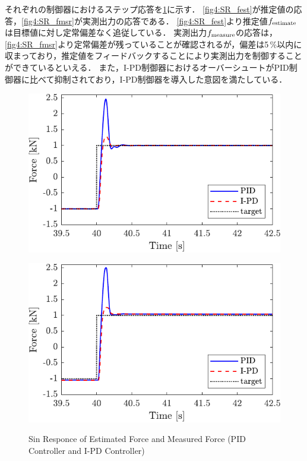 それぞれの制御器におけるステップ応答を\figname\ref{fig4:SRofPIDandIPD}に示す．
\figname\ref{fig4:SR_fest}が推定値の応答，\figname\ref{fig4:SR_fmsr}が実測出力の応答である．
\figname\ref{fig4:SR_fest}より推定値$f_\mathrm{estimate}$は目標値に対し定常偏差なく追従している．
実測出力$f_\mathrm{measure}$の応答は，\figname\ref{fig4:SR_fmsr}より定常偏差が残っていることが確認されるが，偏差は5\,\%以内に収まっており，推定値をフィードバックすることにより実測出力を制御することができているといえる．
また，I-PD制御器におけるオーバーシュートがPID制御器に比べて抑制されており，I-PD制御器を導入した意図を満たしている．

\begin{figure}[tbp]
    \begin{minipage}{\minipageratio\hsize}
        \centering
        \includegraphics[keepaspectratio, width = \minifigwidth]{contents/ForceControl/figure/1115_PIDandI-PDestforce_step.pdf}
        \label{fig4:SR_fest}
    \end{minipage}
    \begin{minipage}{\minipageratio\hsize}
        \centering
        \includegraphics[keepaspectratio, width = \minifigwidth]{contents/ForceControl/figure/1115_PIDandI-PDforce_step.pdf}
        \label{fig4:SR_fmsr}
    \end{minipage}
    \caption{Sin Responce of Estimated Force and Measured Force (PID Controller and I-PD Controller)}
    \label{fig4:SRofPIDandIPD}
\end{figure}


